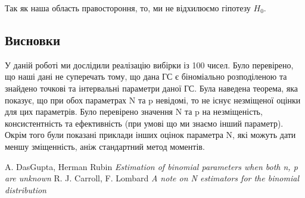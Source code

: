 \documentclass{article}
\begin{document}
Так як наша область правостороння, то, ми не відхилюємо гіпотезу $H_0$.
\subsection{Висновки}
У даній роботі ми дослідили реалізацію вибірки із 100 чисел. Було перевірено, що наші дані не
суперечать тому, що дана ГС є
біноміально розподіленою та знайдено точкові та інтервальні параметри даної ГС. Була наведена
теорема, яка показує, що при обох параметрах N та p невідомі, то не існує незміщеної оцінки для цих
параметрів.
Було перевірено значення N та p на незміщеність, консистентність та ефективність (при умові що ми
знаємо інший параметр).\\

Окрім того були показані приклади інших оцінок параметра N, які можуть дати меншу зміщенність, аніж
стандартний метод моментів.
\begin{thebibliography}{9}
        A. DasGupta, Herman Rubin \textit{Estimation of binomial parameters when both n, p are
        unknown}
        R. J. Carroll, F. Lombard \textit{A note on N estimators for the binomial distribution}
\end{thebibliography}
\end{document}
